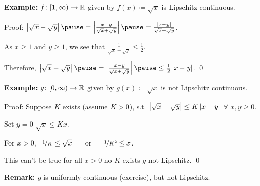 \documentclass[10pt,aspectratio=169]{beamer}
\begin{document}
\begin{frame}
\textbf{Example:}
$f \colon [1,\infty) \to {\mathbb{R}}$ given by $f(x) \coloneqq \sqrt{x}$
is Lipschitz continuous.

\pause
\medskip

Proof:
$
\abs{\sqrt{x}-\sqrt{y}}
\pause
= 
\abs{\frac{x-y}{\sqrt{x}+\sqrt{y}}}
\pause
=
\frac{\abs{x-y}}{\sqrt{x}+\sqrt{y}}$.

\pause
\medskip

As $x \geq 1$ and $y \geq 1$, we see that $\frac{1}{\sqrt{x}+\sqrt{y}}
\leq \frac{1}{2}$.

\pause
Therefore, \quad
$\abs{\sqrt{x}-\sqrt{y}}
\pause
= 
\abs{\frac{x-y}{\sqrt{x}+\sqrt{y}}}
\pause
\leq
\frac{1}{2}
\abs{x-y}$.
\qed

\pause
\medskip

\textbf{Example:}
$g \colon [0,\infty) \to {\mathbb{R}}$ given by
$g(x) \coloneqq \sqrt{x}$ is not Lipschitz continuous.

\pause
\medskip

Proof:  Suppose $K$ exists (assume $K>0$), s.t. 
$\left\lvert {\sqrt{x}-\sqrt{y}} \right\rvert 
\leq
K \left\lvert {x-y} \right\rvert$ $\forall$ $x,y \geq 0$.

\pause
\medskip

Set $y=0$ \wthus $\sqrt{x} \leq K x$.

\pause
For $x > 0$, ~$\nicefrac{1}{K} \leq \sqrt{x}$ ~~ or ~~ $\nicefrac{1}{K^2} \leq x$.

\pause
This can't be true for all $x > 0$ \wthus no $K$ exists
\pause
\wthus
$g$ not Lipschitz.
\qed

\pause
\medskip

\textbf{Remark:} $g$ is uniformly continuous (exercise), but not Lipschitz.

\end{frame}
\end{document}
